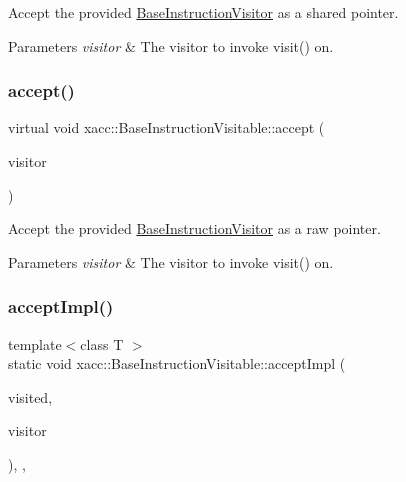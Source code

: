 Accept the provided \hyperlink{a02468}{Base\+Instruction\+Visitor} as a shared pointer. 
\begin{DoxyParams}{Parameters}
{\em visitor} & The visitor to invoke visit() on. \\
\hline
\end{DoxyParams}
\mbox{\label{a02476_ad6b9ad95c14580cc86ca87cd464262c3}} 
\subsubsection{\texorpdfstring{accept()}{accept()}\hspace{0.1cm}{\footnotesize\ttfamily [2/2]}}
{\footnotesize\ttfamily virtual void xacc\+::\+Base\+Instruction\+Visitable\+::accept (\begin{DoxyParamCaption}\item[{\hyperlink{a02468}{Base\+Instruction\+Visitor} $\ast$}]{visitor }\end{DoxyParamCaption})\hspace{0.3cm}{\ttfamily [pure virtual]}}

Accept the provided \hyperlink{a02468}{Base\+Instruction\+Visitor} as a raw pointer. 
\begin{DoxyParams}{Parameters}
{\em visitor} & The visitor to invoke visit() on. \\
\hline
\end{DoxyParams}
\mbox{\label{a02476_a2f18b9fcb48f42d190a9f5180b7b59c5}} 
\subsubsection{\texorpdfstring{accept\+Impl()}{acceptImpl()}\hspace{0.1cm}{\footnotesize\ttfamily [1/2]}}
{\footnotesize\ttfamily template$<$class T $>$ \\
static void xacc\+::\+Base\+Instruction\+Visitable\+::accept\+Impl (\begin{DoxyParamCaption}\item[{T \&}]{visited,  }\item[{std\+::shared\+\_\+ptr$<$ \hyperlink{a02468}{Base\+Instruction\+Visitor} $>$}]{visitor }\end{DoxyParamCaption})\hspace{0.3cm}{\ttfamily [inline]}, {\ttfamily [static]}, {\ttfamily [protected]}}

